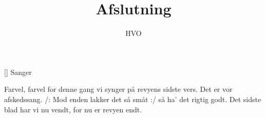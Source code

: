 \documentclass[a4paper,11pt]{article}
\title{Afslutning}
\author{HVO}
\begin{document}
\maketitle

\begin{roles}
[] Sanger 
\end{roles}

\begin{song}
   Farvel, farvel for denne gang
            vi synger på revyens sidste vers.
            Det er vor afskedssang.
            /: Mod enden lakker det så småt :/
            så ha' det rigtig godt.
            Det sidste blad har vi nu vendt,
            for nu er revyen endt.

\end{song}
\end{document}
